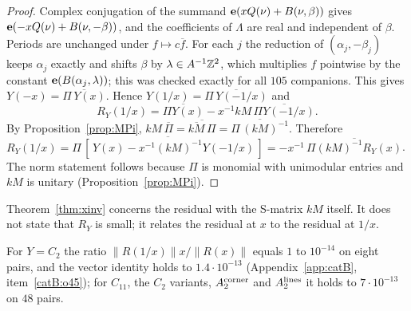 \begin{proof}
Complex conjugation of the summand $\mathbf{e}(xQ(\nu)+B(\nu,\beta))$ gives $\mathbf{e}(-xQ(\nu)+B(\nu,-\beta))$, and the coefficients of $\Lambda$ are real and independent of $\beta$. Periods are unchanged under $f\mapsto c\overline f$. For each $j$ the reduction of $(\alpha_j,-\beta_j)$ keeps
$\alpha_j$ exactly and shifts $\beta$ by $\lambda\in A^{-1}\mathbb{Z}^2$, which multiplies $f$ pointwise by the constant $\mathbf{e}(B(\alpha_j,\lambda))$; this was checked exactly for all $105$ companions.
This gives $Y(-x)=\overline{\Pi\,Y(x)}$. Hence $Y(1/x)=\overline{\Pi\,Y(-1/x)}$ and
\[ R_Y(1/x)=\overline{\Pi Y(x)}-x^{-1}kM\,\overline{\Pi Y(-1/x)}. \]
By Proposition~\ref{prop:MPi}, $kM\,\overline{\Pi}=\overline{\overline{kM}\,\Pi}=\overline{\Pi\,(kM)^{-1}}$. Therefore
$R_Y(1/x)=\overline{\Pi\,[\,Y(x)-x^{-1}(kM)^{-1}Y(-1/x)\,]}=-x^{-1}\,\overline{\Pi(kM)^{-1}R_Y(x)}$. The norm statement follows because $\Pi$ is monomial with unimodular
entries and $kM$ is unitary (Proposition~\ref{prop:MPi}).
\end{proof}
\begin{remark}
Theorem~\ref{thm:xinv} concerns the residual with the S-matrix $kM$ itself. It does not state that $R_Y$ is small; it relates the residual at $x$ to the residual at $1/x$.
\end{remark}
\begin{catbremark}
For $Y=C_2$ the ratio $\|R(1/x)\|x/\|R(x)\|$ equals $1$ to $10^{-14}$ on eight pairs, and the vector identity holds to $1.4\cdot10^{-13}$
(Appendix~\ref{app:catB}, item~\ref{catB:o45}); for $C_{11}$, the $C_2$ variants, $A_2^{\rm corner}$ and $A_2^{\rm lines}$ it holds to $7\cdot10^{-13}$ on $48$ pairs.
\end{catbremark}
